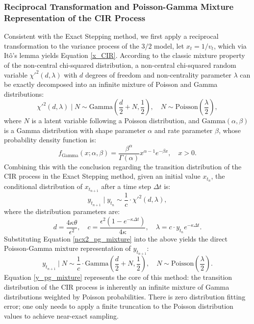 \subsubsection{Reciprocal Transformation and Poisson-Gamma Mixture Representation of the CIR Process}
Consistent with the Exact Stepping method, we first apply a reciprocal transformation to the variance process of the $3/2$ model, let $x_t = 1/v_t$, which via Itô's lemma yields Equation \eqref{x_CIR}. According to the classic mixture property of the non-central chi-squared distribution, a non-central chi-squared random variable $\chi'^2(d,\lambda)$ with $d$ degrees of freedom and non-centrality parameter $\lambda$ can be exactly decomposed into an infinite mixture of Poisson and Gamma distributions:
\begin{equation}\chi'^2(d, \lambda) \mid N \sim \text{Gamma}\left(\frac{d}{2} + N, \frac{1}{2}\right), \quad N \sim \text{Poisson}\left(\frac{\lambda}{2}\right),\label{ncx2_pg_mixture}\end{equation}
where $N$ is a latent variable following a Poisson distribution, and $\text{Gamma}(\alpha,\beta)$ is a Gamma distribution with shape parameter $\alpha$ and rate parameter $\beta$, whose probability density function is:
\begin{equation}
  f_{\text{Gamma}}(x; \alpha, \beta) = \frac{\beta^\alpha}{\Gamma(\alpha)} x^{\alpha-1} e^{-\beta x}, \quad x > 0.
\end{equation}
Combining this with the conclusion regarding the transition distribution of the CIR process in the Exact Stepping method, given an initial value $x_{t_n}$, the conditional distribution of $x_{t_{n+1}}$ after a time step $\Delta t$ is:
\begin{equation}
  y_{t_{n+1}} \mid y_{t_n} \sim \frac{1}{c} \cdot \chi'^2\left(d, \lambda\right),
\end{equation}
where the distribution parameters are:
\begin{equation}
  d = \frac{4\kappa\theta}{\epsilon^2}, \quad c = \frac{\epsilon^2\left(1 - e^{-\kappa\Delta t}\right)}{4\kappa}, \quad \lambda = c \cdot y_{t_n} e^{-\kappa\Delta t}.
\end{equation}
Substituting Equation \eqref{ncx2_pg_mixture} into the above yields the direct Poisson-Gamma mixture representation of $y_{t_{n+1}}$:
\begin{equation}
  y_{t_{n+1}} \mid N \sim \frac{1}{c} \cdot \text{Gamma}\left(\frac{d}{2} + N, \frac{1}{2}\right), \quad N \sim \text{Poisson}\left(\frac{\lambda}{2}\right).
\label{y_pg_mixture}
\end{equation}
Equation \eqref{y_pg_mixture} represents the core of this method: the transition distribution of the CIR process is inherently an infinite mixture of Gamma distributions weighted by Poisson probabilities. There is zero distribution fitting error; one only needs to apply a finite truncation to the Poisson distribution values to achieve near-exact sampling.

